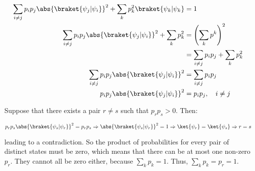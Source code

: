 \begin{align}
\sum_{i \ne j}{p_i p_j \abs{\braket{\psi_j|\psi_i}}}^2 + \sum_k{p_k^2
\braket{\psi_k|\psi_k}} &= 1 \\
\sum_{i \ne j}{p_i p_j \abs{\braket{\psi_j|\psi_i}}}^2 + \sum_k{p_k^2} &= \left(
\sum_k{p^k} \right)^2 \\
&= \sum_{i \ne j}{p_i p_j} + \sum_k{p_k^2} \\
\sum_{i \ne j}{p_i p_j \abs{\braket{\psi_j|\psi_i}}}^2 &= \sum_{i \ne j}{p_i
p_j} \\
p_i p_j \abs{\braket{\psi_j|\psi_i}}^2 &= p_i p_j, \quad i \ne j
\end{align}

Suppose that there exists a pair $r \ne s$ such that $p_r p_s > 0$. Then:

$$
p_r p_s \abs{\braket{\psi_s|\psi_r}}^2 = p_r p_s \Rightarrow
\abs{\braket{\psi_s|\psi_r}}^2 = 1 \Rightarrow \ket{\psi_r} = \ket{\psi_s}
\Rightarrow r = s
$$

leading to a contradiction. So the product of probabilities for every pair of
distinct states must be zero, which means that there can be at most one non-zero
$p_r$.  They cannot all be zero either, because $\sum_k{p_k} = 1$. Thus,
$\sum_k{p_k} = p_r = 1$.
